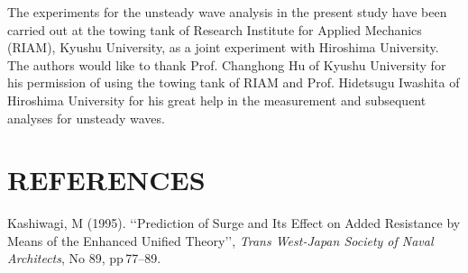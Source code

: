 \documentclass[11pt,fleqn,a3]{article}
\begin{document}
\newpage\smallskip
\medskip%
%
The experiments for the unsteady wave analysis in the present study 
have been carried out at the towing tank of 
Research Institute for Applied Mechanics (RIAM), Kyushu University, as a joint 
experiment with Hiroshima University.
The authors would like to thank Prof. Changhong Hu of Kyushu University for 
his permission of using the towing tank of RIAM and Prof. Hidetsugu Iwashita of 
Hiroshima University for his great help in the measurement and 
subsequent analyses for unsteady waves.


\medskip%
\section*{REFERENCES} \par\vspace*{-0.0mm}

\hspace*{4mm}\begin{minipage}[t]{87.0mm}
\noindent\hspace*{-5.0mm}
Kashiwagi, M (1995). \lq\lq Prediction \hs of \hs Surge and Its Effect on 
Added Resistance by Means of the Enhanced Unified Theory\rq\rq, 
{\it Trans West-Japan Society of Naval Architects}, No\,\,89, pp\,77\hs--89.
\end{minipage}\hfill
\end{document}
